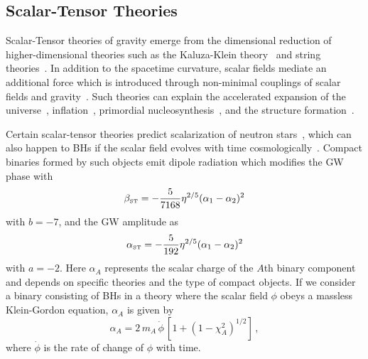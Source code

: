 \documentclass[prd,twocolumn,nofootinbib]{revtex4-1}
\newcommand\be{\begin{equation}}
\newcommand\ee{\end{equation}}
\newcommand{\ST}{{\mbox{\tiny ST}}}
\begin{document}
\subsection{Scalar-Tensor Theories}
Scalar-Tensor theories of gravity emerge from the dimensional reduction of higher-dimensional theories such as the Kaluza-Klein theory~\cite{Fujii:2003pa,Overduin:1998pn} and string theories~\cite{polchinski1,polchinski2}. In addition to the spacetime curvature, scalar fields mediate an additional force which is introduced through non-minimal couplings of scalar fields and gravity~\cite{Berti:2015itd,Chiba:1997ms,PhysRevD.6.2077}. Such theories can explain the accelerated expansion of the universe~\cite{Brax:2004qh,PhysRevD.73.083510,PhysRevD.62.123510,PhysRevD.66.023525,Schimd:2004nq}, inflation~\cite{Burd:1991ns,Barrow:1990nv,Clifton:2011jh}, primordial nucleosynthesis~\cite{Coc:2006rt,Damour:1998ae,Larena:2005tu,Torres:1995je}, and the structure formation~\cite{Brax:2005ew}. 

Certain scalar-tensor theories predict scalarization of neutron stars~\cite{PhysRevLett.70.2220,Barausse:2012da}, which can also happen to BHs if the scalar field evolves with time cosmologically~\cite{Jacobson:1999vr,Horbatsch:2011ye}. Compact binaries formed by such objects emit dipole radiation which modifies the GW phase with~\cite{Freire:2012mg,Wex:2014nva,Tahura:2018zuq}
\be\label{eq:betaST}
\beta_{\ST}=-\frac{5}{7168}\eta ^{2/5}(\alpha_1-\alpha_2)^2
\ee
with $b=-7$, and the GW amplitude as~\cite{Tahura:2018zuq}
\be\label{eq:alphaST}
\alpha_{\ST}=-\frac{5}{192}\eta ^{2/5}(\alpha_1-\alpha_2)^2
\ee
with $a=-2$. Here $\alpha_A$ represents the scalar charge of the $A$th binary component and depends on specific theories and the type of compact objects. If we consider a binary consisting of BHs in a theory where the scalar field $\phi$ obeys a massless Klein-Gordon equation, $\alpha_A$ is given by~\cite{Horbatsch:2011ye}
\be\label{eq:alpha_A}
\alpha_A = 2 \, m_A \, \dot \phi\, [1+(1-\chi_A^2)^{1/2}]\,,
\ee
where $\dot{\phi}$ is the rate of change of $\phi$ with time.
\end{document}
